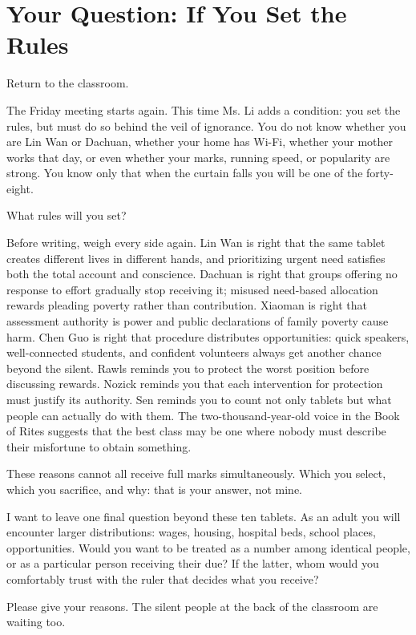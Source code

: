 \section{Your Question: If You Set the Rules}
Return to the classroom.

The Friday meeting starts again. This time Ms. Li adds a condition: you set the rules, but must do so behind the veil of ignorance. You do not know whether you are Lin Wan or Dachuan, whether your home has Wi-Fi, whether your mother works that day, or even whether your marks, running speed, or popularity are strong. You know only that when the curtain falls you will be one of the forty-eight.

What rules will you set?

Before writing, weigh every side again. Lin Wan is right that the same tablet creates different lives in different hands, and prioritizing urgent need satisfies both the total account and conscience. Dachuan is right that groups offering no response to effort gradually stop receiving it; misused need-based allocation rewards pleading poverty rather than contribution. Xiaoman is right that assessment authority is power and public declarations of family poverty cause harm. Chen Guo is right that procedure distributes opportunities: quick speakers, well-connected students, and confident volunteers always get another chance beyond the silent. Rawls reminds you to protect the worst position before discussing rewards. Nozick reminds you that each intervention for protection must justify its authority. Sen reminds you to count not only tablets but what people can actually do with them. The two-thousand-year-old voice in the Book of Rites suggests that the best class may be one where nobody must describe their misfortune to obtain something.

These reasons cannot all receive full marks simultaneously. Which you select, which you sacrifice, and why: that is your answer, not mine.

I want to leave one final question beyond these ten tablets. As an adult you will encounter larger distributions: wages, housing, hospital beds, school places, opportunities. Would you want to be treated as a number among identical people, or as a particular person receiving their due? If the latter, whom would you comfortably trust with the ruler that decides what you receive?

Please give your reasons. The silent people at the back of the classroom are waiting too.
